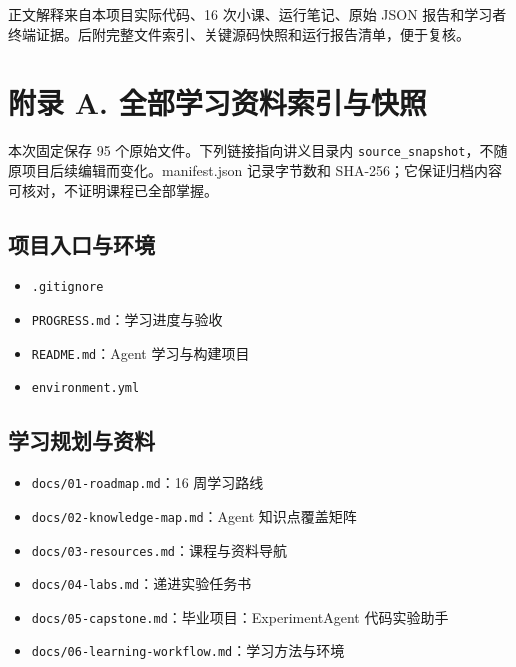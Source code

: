 \documentclass[UTF8,zihao=-4,fontset=fandol]{ctexart}
\begin{document}
正文解释来自本项目实际代码、16 次小课、运行笔记、原始 JSON 报告和学习者终端证据。后附完整文件索引、关键源码快照和运行报告清单，便于复核。

\section{附录 A. 全部学习资料索引与快照}
本次固定保存 95 个原始文件。下列链接指向讲义目录内 \nolinkurl{source_snapshot}，不随原项目后续编辑而变化。manifest.json 记录字节数和 SHA-256；它保证归档内容可核对，不证明课程已全部掌握。

\subsection{项目入口与环境}
\begin{itemize}
\item \nolinkurl{.gitignore}
\item \nolinkurl{PROGRESS.md}：学习进度与验收
\item \nolinkurl{README.md}：Agent 学习与构建项目
\item \nolinkurl{environment.yml}
\end{itemize}

\subsection{学习规划与资料}
\begin{itemize}
\item \nolinkurl{docs/01-roadmap.md}：16 周学习路线
\item \nolinkurl{docs/02-knowledge-map.md}：Agent 知识点覆盖矩阵
\item \nolinkurl{docs/03-resources.md}：课程与资料导航
\item \nolinkurl{docs/04-labs.md}：递进实验任务书
\item \nolinkurl{docs/05-capstone.md}：毕业项目：ExperimentAgent 代码实验助手
\item \nolinkurl{docs/06-learning-workflow.md}：学习方法与环境
\end{itemize}
\end{document}
